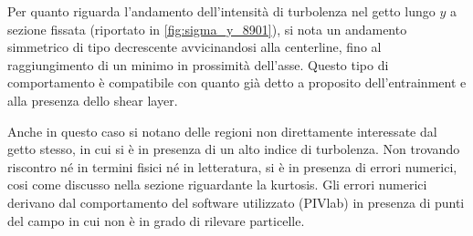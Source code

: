 \documentclass{article} %
\begin{document}
Per quanto riguarda l'andamento dell'intensità di turbolenza nel getto lungo $y$ a sezione fissata (riportato in \cref{fig:sigma_y_8901}), si nota un andamento simmetrico di tipo decrescente avvicinandosi alla centerline, fino al raggiungimento di un minimo in prossimità dell'asse. Questo tipo di comportamento è compatibile con quanto già detto a proposito dell'entrainment e alla presenza dello shear layer.\par
Anche in questo caso si notano delle regioni non direttamente interessate dal getto stesso, in cui si è in presenza di un alto indice di turbolenza. Non trovando riscontro né in termini fisici né in letteratura, si è in presenza di errori numerici, cosi come discusso nella sezione riguardante la kurtosis. Gli errori numerici derivano dal comportamento del software utilizzato (PIVlab) in presenza di punti del campo in cui non è in grado di rilevare particelle.
\end{document}
